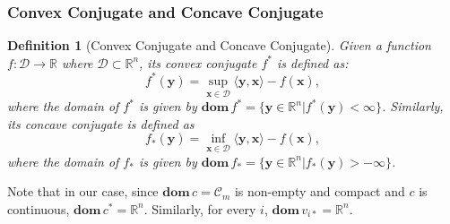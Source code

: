 \documentclass{article}
\newtheorem{definition}{Definition}[section]
\begin{document}
\subsubsection{Convex Conjugate and Concave Conjugate}
\begin{definition}[Convex Conjugate and Concave Conjugate]\label{convConjgt}
    Given a function $f:\mathcal{D}\to \mathbb{R}$ where $\mathcal{D}\subset \mathbb{R}^n$, its convex conjugate $f^*$ is defined as:
    \begin{equation}
        f^*(\mathbf{y})=\sup_{\mathbf{x}\in \mathcal{D}}\langle \mathbf{y},\mathbf{x}\rangle-f(\mathbf{x}),
    \end{equation}
    where the domain of $f^*$ is given by $\mathbf{dom}\,f^*=\{\mathbf{y}\in \mathbb{R}^n|f^*(\mathbf{y})<\infty\}$. Similarly, its concave conjugate is defined as
    \begin{equation}
        f_*(\mathbf{y})=\inf_{\mathbf{x}\in \mathcal{D}}\langle \mathbf{y},\mathbf{x}\rangle-f(\mathbf{x}),
    \end{equation}
    where the domain of $f_*$ is given by $\mathbf{dom}\,f_*=\{\mathbf{y}\in \mathbb{R}^n|f_*(\mathbf{y})>-\infty\}$.
\end{definition}
Note that in our case, since $\mathbf{dom}\,c=\mathcal{C}_m$ is non-empty and compact and $c$ is continuous, $\mathbf{dom}\,c^*=\mathbb{R}^n$. Similarly, for every $i$, $\mathbf{dom}\,v_{i*}=\mathbb{R}^n$.
\end{document}
